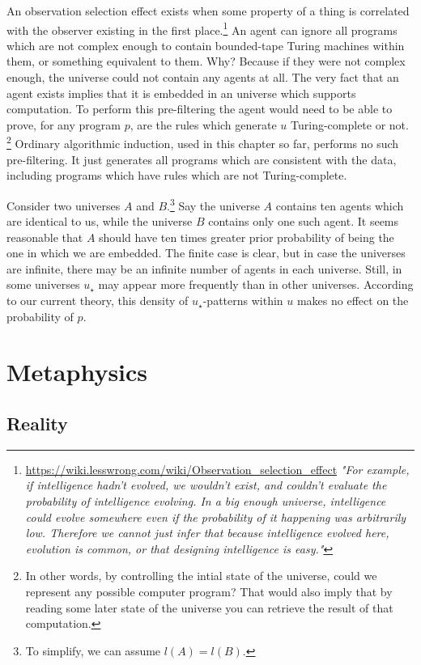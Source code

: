 \documentclass[oneside,hidelinks]{article}
\begin{document}
An observation selection effect exists when some property of a thing is correlated with the observer existing in the first place.\footnote{
\url{https://wiki.lesswrong.com/wiki/Observation_selection_effect}
\textit{"For example, if intelligence hadn't evolved, we wouldn't exist, and couldn't evaluate the probability of intelligence evolving.
In a big enough universe, intelligence could evolve somewhere even if the probability of it happening was arbitrarily low.
Therefore we cannot just infer that because intelligence evolved here, evolution is common, or that designing intelligence is easy."}
}
An agent can ignore all programs which are not complex enough to contain bounded-tape Turing machines within them, or something equivalent to them.
Why?
Because if they were not complex enough, the universe could not contain any agents at all.
The very fact that an agent exists implies that it is embedded in an universe which supports computation.
To perform this pre-filtering the agent would need to be able to prove, for any program $p$, are the rules which generate $u$ Turing-complete or not. \footnote{
In other words, by controlling the intial state of the universe, could we represent any possible computer program?
That would also imply that by reading some later state of the universe you can retrieve the result of that computation.
}
Ordinary algorithmic induction, used in this chapter so far, performs no such pre-filtering.
It just generates all programs which are consistent with the data, including programs which have rules which are not Turing-complete.

Consider two universes $A$ and $B$.\footnote{To simplify, we can assume $l(A) = l(B)$.}
Say the universe $A$ contains ten agents which are identical to us, while the universe $B$ contains only one such agent.
It seems reasonable that $A$ should have ten times greater prior probability of being the one in which we are embedded.
The finite case is clear, but in case the universes are infinite, there may be an infinite number of agents in each universe.
Still, in some universes $u_\star$ may appear more frequently than in other universes.
According to our current theory, this density of $u_\star$-patterns within $u$ makes no effect on the probability of $p$.

\newpage

\section{Metaphysics}

\subsection{Reality}
\end{document}
